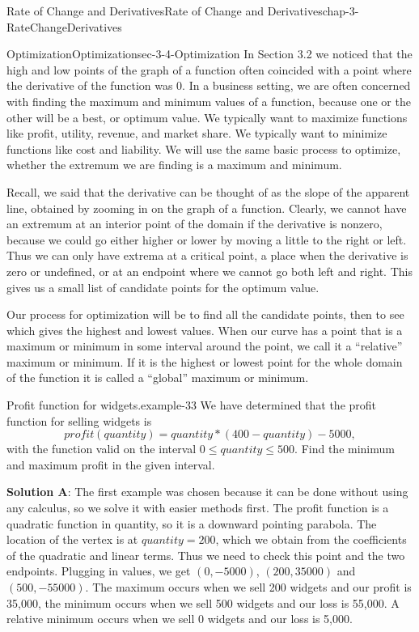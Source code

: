 \documentclass[oneside,10pt,]{book}
\newcommand{\terminology}[1]{\textbf{#1}}
\numberwithin{equation}{section}
\begin{document}
\begin{chapterptx}{Rate of Change and Derivatives}{}{Rate of Change and Derivatives}{}{}{chap-3-RateChangeDerivatives}
\begin{sectionptx}{Optimization}{}{Optimization}{}{}{sec-3-4-Optimization}
In Section 3.2 we noticed that the high and low points of the graph of a function often coincided with a point where the derivative of the function was 0.  In a business setting, we are often concerned with finding the maximum and minimum values of a function, because one or the other will be a best, or optimum value.  We typically want to maximize functions like profit, utility, revenue, and market share.  We typically want to minimize functions like cost and liability.  We will use the same basic process to optimize, whether the extremum we are finding is a maximum and minimum.%
\par
\hypertarget{p-1202}{}%
Recall, we said that the derivative can be thought of as the slope of the apparent line, obtained by zooming in on the graph of a function.  Clearly, we cannot have an extremum at an interior point of the domain if the derivative is nonzero, because we could go either higher or lower by moving a little to the right or left.  Thus we can only have extrema at a critical point, a place when the derivative is zero or undefined, or at an endpoint where we cannot go both left and right.  This gives us a small list of candidate points for the optimum value.%
\par
\hypertarget{p-1203}{}%
Our process for optimization will be to find all the candidate points, then to see which gives the highest and lowest values.  When our curve has a point that is a maximum or minimum in some interval around the point, we call it a ``relative'' maximum or minimum.  If it is the highest or lowest point for the whole domain of the function it is called a ``global'' maximum or minimum.%
\begin{example}{Profit function for widgets.}{example-33}%
\hypertarget{p-1204}{}%
We have determined that the profit function for selling widgets is%
%
\begin{equation*}
profit(quantity)=quantity*(400-quantity)-5000,
\end{equation*}
\hypertarget{p-1205}{}%
with the function valid on the interval \(0\le quantity\le 500\).  Find the minimum and maximum profit in the given interval.%
\par
\hypertarget{p-1206}{}%
\terminology{Solution A}: The first example was chosen because it can be done without using any calculus, so we solve it with easier methods first.  The profit function is a quadratic function in quantity, so it is a downward pointing parabola.  The location of the vertex is at \(quantity=200\), which we obtain from the coefficients of the quadratic and linear terms.  Thus we need to check this point and the two endpoints.  Plugging in values, we get \((0,-5000)\), \((200, 35000)\) and \((500, -55000)\).  The maximum occurs when we sell 200 widgets and our profit is \textdollar{}35,000, the minimum occurs when we sell 500 widgets and our loss is \textdollar{}55,000.  A relative minimum occurs when we sell 0 widgets and our loss is \textdollar{}5,000.%

\end{example}
\end{sectionptx}
\end{chapterptx}
\end{document}
